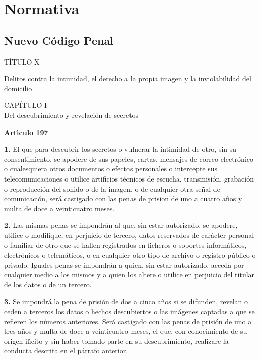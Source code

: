 \chapter{Normativa}
\section{Nuevo C\'odigo Penal}
\begin{center}
{\LARGE T\'ITULO X} 
\end{center}
{\large Delitos contra la intimidad, el derecho a la propia imagen y la 
inviolabilidad del domicilio} 
\begin{center} 
{\Large CAP\'ITULO I}\\ 
Del descubrimiento y revelaci\'on de secretos 
\end{center} 
{\large {\bf Art\'{\i}culo 197}} 

{\bf 1.} El que para descubrir los secretos o vulnerar la intimidad de otro, 
sin su consentimiento, se apodere de sus papeles, cartas, mensajes de correo 
electr\'onico o cualesquiera otros documentos o efectos personales o intercepte 
sus telecomunicaciones o utilice artificios t\'ecnicos de escucha, 
transmisi\'on, grabaci\'on o reproducci\'on del sonido o de la imagen, o de 
cualquier otra se\~nal de comunicaci\'on, ser\'a castigado con las penas de 
prision de uno a cuatro a\~nos y multa de doce a veinticuatro meses. 
 
{\bf 2.} Las mismas penas se impondr\'an al que, sin estar autorizado, se 
apodere, utilice o modifique, en perjuicio de tercero, datos reservados de 
car\'acter personal o familiar de otro que se hallen registrados en ficheros o 
soportes inform\'aticos, electr\'onicos o telem\'aticos, o en cualquier otro 
tipo de archivo o registro p\'ublico o privado. Iguales penas se impondr\'an a 
quien, sin estar autorizado, acceda por cualquier medio a los mismos y a quien
los altere o utilice en perjuicio del titular de los datos o de un tercero.  
 
{\bf 3.} Se impondr\'a la pena de prisi\'on de dos a cinco a\~nos si se 
difunden, revelan o ceden a terceros los datos o hechos descubiertos o las 
im\'agenes captadas a que se refieren los n\'umeros anteriores. Ser\'a 
castigado con las penas de prisi\'on de uno a tres a\~nos y multa de doce a 
veinticuatro meses, el que, con conocimiento de su origen il\'{\i}cito y sin 
haber tomado parte en su descubrimiento, realizare la conducta descrita en el 
p\'arrafo anterior. 
 
